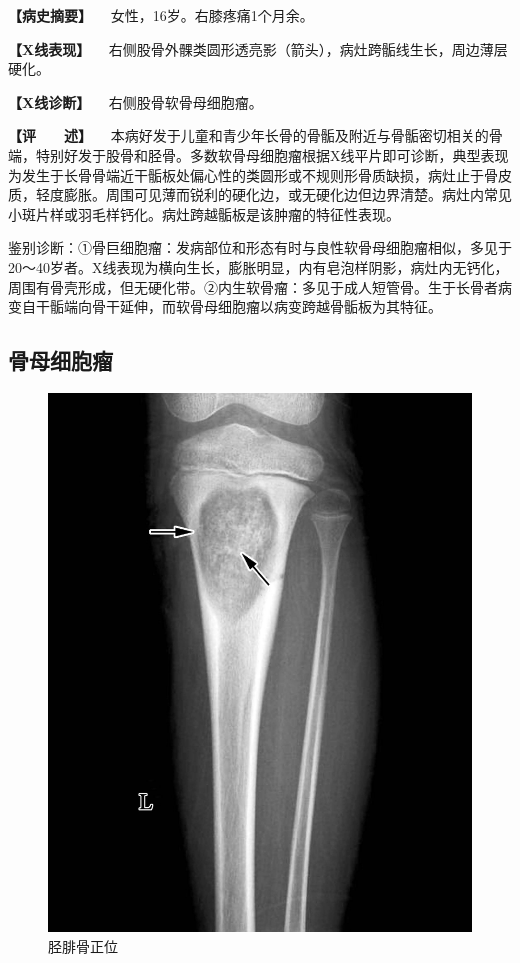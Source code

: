 \textbf{【病史摘要】} 　女性，16岁。右膝疼痛1个月余。

\textbf{【X线表现】}
　右侧股骨外髁类圆形透亮影（箭头），病灶跨骺线生长，周边薄层硬化。

\textbf{【X线诊断】} 　右侧股骨软骨母细胞瘤。

\textbf{【评　　述】}
　本病好发于儿童和青少年长骨的骨骺及附近与骨骺密切相关的骨端，特别好发于股骨和胫骨。多数软骨母细胞瘤根据X线平片即可诊断，典型表现为发生于长骨骨端近干骺板处偏心性的类圆形或不规则形骨质缺损，病灶止于骨皮质，轻度膨胀。周围可见薄而锐利的硬化边，或无硬化边但边界清楚。病灶内常见小斑片样或羽毛样钙化。病灶跨越骺板是该肿瘤的特征性表现。

鉴别诊断：①骨巨细胞瘤：发病部位和形态有时与良性软骨母细胞瘤相似，多见于20～40岁者。X线表现为横向生长，膨胀明显，内有皂泡样阴影，病灶内无钙化，周围有骨壳形成，但无硬化带。②内生软骨瘤：多见于成人短管骨。生于长骨者病变自干骺端向骨干延伸，而软骨母细胞瘤以病变跨越骨骺板为其特征。

\subsection{骨母细胞瘤}

\begin{figure}[!htbp]
 \centering
 \includegraphics{./images/Image00094.jpg}
 \captionsetup{justification=centering}
 \caption{胫腓骨正位}
 \label{fig2-7-9}
  \end{figure} 


